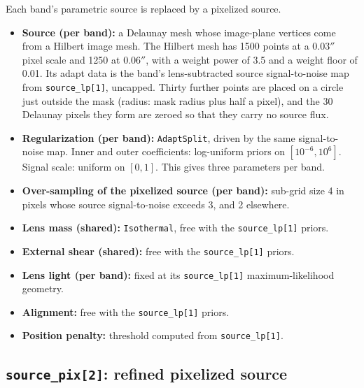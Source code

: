 Each band's parametric source is replaced by a pixelized source.
\begin{itemize}
    \item \textbf{Source (per band):} a Delaunay mesh whose image-plane vertices come from a Hilbert
    image mesh. The Hilbert mesh has 1500 points at a $0.03''$ pixel scale and 1250 at $0.06''$, with
    a weight power of 3.5 and a weight floor of 0.01. Its adapt data is the band's
    lens-subtracted source signal-to-noise map from \texttt{source\_lp[1]}, uncapped. Thirty further
    points are placed on a circle just outside the mask (radius: mask radius plus half a pixel), and
    the 30 Delaunay pixels they form are zeroed so that they carry no source flux.
    \item \textbf{Regularization (per band):} \texttt{AdaptSplit}, driven by the same signal-to-noise
    map. Inner and outer coefficients: log-uniform priors on $[10^{-6}, 10^6]$. Signal scale: uniform
    on $[0, 1]$. This gives three parameters per band.
    \item \textbf{Over-sampling of the pixelized source (per band):} sub-grid size 4 in pixels whose
    source signal-to-noise exceeds 3, and 2 elsewhere.
    \item \textbf{Lens mass (shared):} \texttt{Isothermal}, free with the \texttt{source\_lp[1]}
    priors.
    \item \textbf{External shear (shared):} free with the \texttt{source\_lp[1]} priors.
    \item \textbf{Lens light (per band):} fixed at its \texttt{source\_lp[1]} maximum-likelihood
    geometry.
    \item \textbf{Alignment:} free with the \texttt{source\_lp[1]} priors.
    \item \textbf{Position penalty:} threshold computed from \texttt{source\_lp[1]}.
\end{itemize}

\subsection{\label{sc:pipeline_source_pix_2}\texttt{source\_pix[2]}: refined pixelized source}

